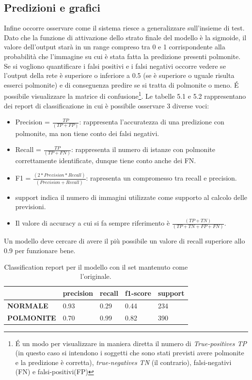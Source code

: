 \subsection{Predizioni e grafici}
Infine occorre osservare come il sistema riesce a generalizzare sull’insieme di test. 
Dato che la funzione di attivazione dello strato finale del modello è la sigmoide, 
il valore dell’output starà in un range compreso tra 0 e 1 corrispondente alla probabilità che l’immagine
 su cui è stata fatta la predizione presenti polmonite. 
Se si vogliono quantificare i falsi positivi e i falsi negativi occorre vedere se l’output della 
rete è superiore o inferiore a 0.5 (se è superiore o uguale risulta esserci polmonite) e di conseguenza predire se si tratta di polmonite o meno.
 É possibile visualizzare la matrice di confusione\footnote{É un modo per visualizzare in maniera 
 diretta il numero di \emph{True-positives TP} (in questo caso si intendono i soggetti che 
 sono stati previsti avere polmonite e la predizione è corretta), \emph{true-negatives TN} (il contrario),
  falsi-negativi (FN) e falsi-positivi(FP)}. 
 Le tabelle 5.1 e 5.2 rappresentano dei report di classificazione in cui è possibile osservare 3 diverse voci:
\begin{itemize}
  \item Precision = $\frac{TP}{(TP + FP)}$: rappresenta l'accuratezza di una predizione con polmonite, ma non tiene conto dei falsi negativi.
  \item Recall  = $\frac{TP}{(TP + FN)}$: rappresenta il numero di istanze con polmonite
   correttamente identificate, dunque tiene conto anche dei FN.
  \item F1 = $\frac{(2 * Precision * Recall)}{(Precision + Recall)}$: rapresenta un compromesso tra recall e precision.
  
  \item support indica il numero di immagini utilizzate come supporto al calcolo delle previsioni.\\
  \item Il valore di accuracy a cui si fa sempre riferimento è $\frac{(TP + TN)}{(TP + TN + FP + FN)}$.
\end{itemize}
Un modello deve cercare di avere il più possibile un valore di recall superiore allo 0.9 per funzionare bene.
% 



  \begin{table}[hb!]
  \begin{tabular}{@{}l|llll@{}}
    \toprule
                     & \textbf{precision} & \textbf{recall} & \textbf{f1-score} & \textbf{support} \\ \midrule
  \textbf{NORMALE}   & 0.93               & 0.29            & 0.44              & 234              \\
  \textbf{POLMONITE} & 0.70               & 0.99            & 0.82              & 390              \\ \midrule
  \end{tabular}
  \caption{Classification report per il modello con il set mantenuto come l'originale.}
\end{table} 
  

